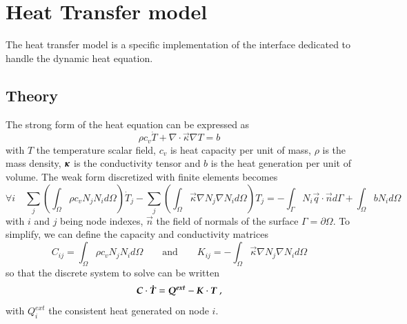 \section{Heat Transfer model}

The heat transfer model is a specific implementation of the  interface
dedicated to handle the dynamic heat equation. 
\subsection{Theory}
The strong form of the heat equation 
can be expressed as
\begin{equation}
  \rho c_v \dot{T} + \nabla \cdot \vec{\kappa} \nabla T = b
\end{equation}
with $T$ the temperature scalar field,
$c_v$ is heat capacity per unit of mass, 
$\rho$ is the mass density, 
$\boldsymbol{\kappa}$ is the conductivity tensor and $b$ is the heat generation per unit of volume. 
The weak form discretized with finite elements becomes
\begin{equation}
  \forall i \quad 
  \sum_j \left( \int_\Omega \rho c_v N_j N_i  d\Omega \right) \dot{T}_j 
  - \sum_j \left( \int_\Omega \vec{\kappa} \nabla N_j \nabla N_i d\Omega \right) T_j = 
  - \int_{\Gamma}  N_i \vec{q} \cdot \vec{n} d\Gamma + \int_\Omega b N_i d\Omega
\end{equation}
with $i$ and $j$ being node indexes, $\vec{n}$ the field of normals of the surface 
$\Gamma = \partial \Omega$. 
To simplify, we can define the capacity and conductivity matrices
\begin{equation}
  C_{ij} = \int_\Omega \rho c_v N_j N_i  d\Omega \qquad \textrm{and} \qquad   
  K_{ij} = - \int_\Omega \vec{\kappa} \nabla N_j \nabla N_i d\Omega
\end{equation}
so that the discrete system to solve can be written
\begin{equation}
  \boldsymbol{C} \cdot \boldsymbol{\dot{T}} = \boldsymbol{Q^{ext}} -\boldsymbol{K} \cdot \boldsymbol{T}~, 
\end{equation}
with $Q^{ext}_i$ the consistent heat generated on node $i$.
